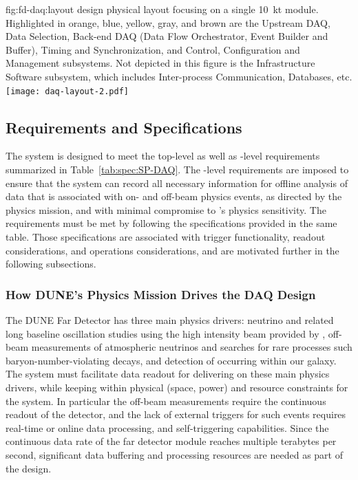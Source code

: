 
\begin{dunefigure}{fig:fd-daq:layout}{ design physical
    layout focusing on a single \SI{10}{\kilo\tonne}
    module. Highlighted in orange, blue, yellow, gray, and brown are
    the Upstream DAQ, Data Selection, Back-end DAQ (Data Flow
    Orchestrator, Event Builder and Buffer), Timing and
    Synchronization, and Control,
    Configuration and Management subsystems. Not depicted in this figure
    is the Infrastructure Software subsystem, which includes Inter-process
    Communication, Databases, etc.
  }
  \texttt{[image: daq-layout-2.pdf]}
\end{dunefigure}


\subsection{Requirements and Specifications}
\label{sec:fd-daq:requirements}

The    system is designed to meet the
 top-level as well as -level requirements
summarized in Table~\ref{tab:spec:SP-DAQ}. The -level requirements are
imposed to ensure that the 
system %
can record all necessary information for offline 
analysis of data that is associated with on- and off-beam physics events, as directed
by the  physics mission, and with minimal compromise to
's physics sensitivity. The requirements must be met by following the 
specifications provided in the same table. Those specifications are
associated with trigger functionality, readout considerations,
and operations considerations, and are motivated further in the following subsections.

\subsubsection{How DUNE's Physics Mission Drives the DAQ Design}

The DUNE Far Detector has three main physics drivers: neutrino  and related
long baseline oscillation studies using the high intensity beam provided
by \fnal, off-beam measurements of atmospheric neutrinos and searches
for rare processes such baryon-number-violating decays,
and detection of  occurring within our galaxy. The
   system must facilitate data
readout for delivering on these main physics drivers, while keeping
within physical (space, power) and resource constraints for
the system. In particular the off-beam measurements require the
continuous readout of the detector, and the lack of external triggers for such
events requires real-time or online data processing, and
self-triggering capabilities. Since the
continuous data rate of the far detector module reaches multiple
terabytes per second, significant data buffering and processing
resources are needed as part of the design.

